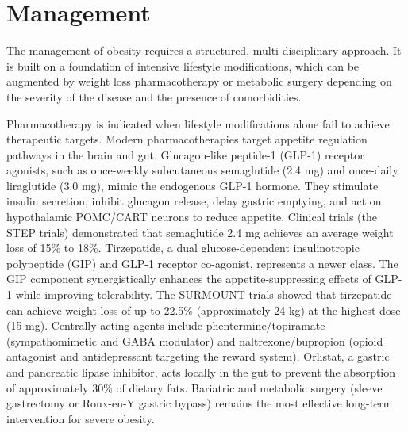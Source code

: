 \section*{Management}
The management of obesity requires a structured, multi-disciplinary approach. It is built on a foundation of intensive lifestyle modifications, which can be augmented by weight loss pharmacotherapy or metabolic surgery depending on the severity of the disease and the presence of comorbidities.

Pharmacotherapy is indicated when lifestyle modifications alone fail to achieve therapeutic targets. Modern pharmacotherapies target appetite regulation pathways in the brain and gut. Glucagon-like peptide-1 (GLP-1) receptor agonists, such as once-weekly subcutaneous semaglutide (2.4 mg) and once-daily liraglutide (3.0 mg), mimic the endogenous GLP-1 hormone. They stimulate insulin secretion, inhibit glucagon release, delay gastric emptying, and act on hypothalamic POMC/CART neurons to reduce appetite. Clinical trials (the STEP trials) demonstrated that semaglutide 2.4 mg achieves an average weight loss of 15\% to 18\%. Tirzepatide, a dual glucose-dependent insulinotropic polypeptide (GIP) and GLP-1 receptor co-agonist, represents a newer class. The GIP component synergistically enhances the appetite-suppressing effects of GLP-1 while improving tolerability. The SURMOUNT trials showed that tirzepatide can achieve weight loss of up to 22.5\% (approximately 24 kg) at the highest dose (15 mg). Centrally acting agents include phentermine/topiramate (sympathomimetic and GABA modulator) and naltrexone/bupropion (opioid antagonist and antidepressant targeting the reward system). Orlistat, a gastric and pancreatic lipase inhibitor, acts locally in the gut to prevent the absorption of approximately 30\% of dietary fats. Bariatric and metabolic surgery (sleeve gastrectomy or Roux-en-Y gastric bypass) remains the most effective long-term intervention for severe obesity.


